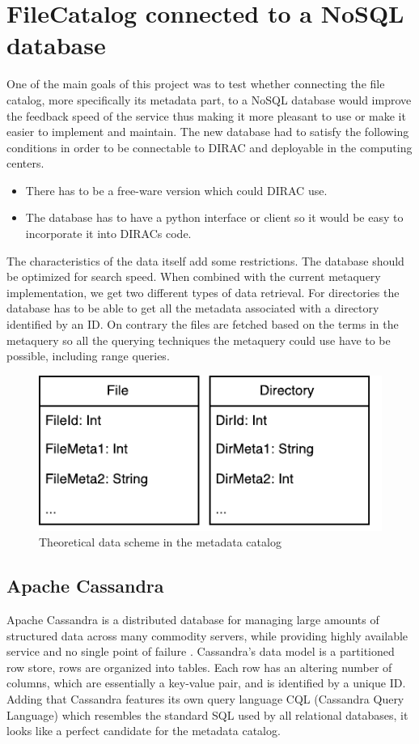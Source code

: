 \chapter{FileCatalog connected to a NoSQL database}
One of the main goals of this project was to test whether connecting the 
file catalog, more specifically its metadata part, to a NoSQL database would 
improve the feedback speed of the service thus making it more pleasant to use
or make it easier to implement and maintain. The new database had to satisfy the
following conditions in order to be connectable to DIRAC and deployable in
the computing centers.

\begin{itemize}
\item There has to be a free-ware version which could DIRAC use.
\item The database has to have a python interface or client so it would be easy
to incorporate it into DIRACs code.
\end{itemize}

The characteristics of the data itself add some restrictions. The database should be
optimized for search speed. When combined with the current metaquery implementation, we
get two different types of data retrieval. For directories 
the database has to be able to get all the metadata associated with a directory
identified by an ID. On contrary the files are fetched based on the terms in the metaquery so
all the querying techniques the metaquery could use have to be possible, including
range queries. 

\begin{figure}[h]
\centering
\includegraphics[scale=0.9]{img/dataTyp.pdf}
\caption{Theoretical data scheme in the metadata catalog}
\label{fig:theoDataScheme}
\end{figure}


\section{Apache Cassandra}
Apache Cassandra is a distributed database for managing large amounts of structured data 
across many commodity servers, while providing highly available service and no single point 
of failure \cite{cassandra}. Cassandra's data model is a
partitioned row store, rows are organized into tables. Each row
has an altering number of columns, which are essentially a
key-value pair, and is identified by a unique ID. Adding that Cassandra features
its own query language CQL (Cassandra Query Language) which resembles the standard SQL 
used by all relational databases, it looks like a perfect candidate for the metadata catalog.

